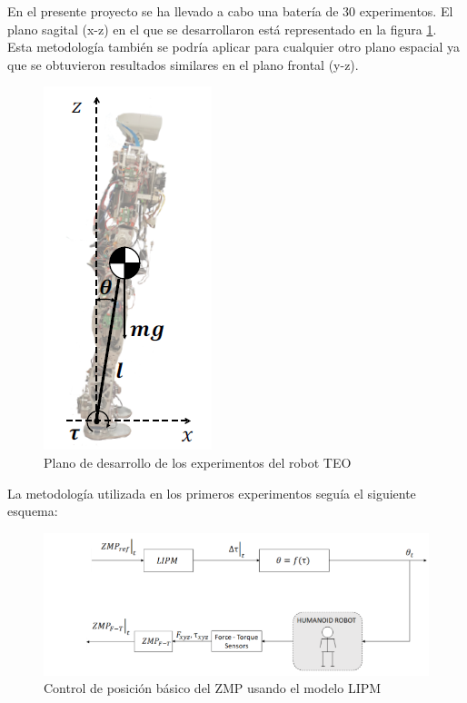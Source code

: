 En el presente proyecto se ha llevado a cabo una batería de 30 experimentos. El plano sagital (x-z) en el que se desarrollaron está representado en la figura \ref{figura53}. Esta metodología también se podría aplicar para cualquier otro plano espacial ya que se obtuvieron resultados similares en el plano frontal (y-z).

\begin{figure}[H]
\centering
\includegraphics[scale=0.65]{imagenes/apartado_5/53_postura_inicial_experimental_teo}
\caption{Plano de desarrollo de los experimentos del robot TEO}
\label{figura53}
\end{figure}

La metodología utilizada en los primeros experimentos seguía el siguiente esquema:

\begin{figure}[H]
\centering
\includegraphics[scale=2.2]{imagenes/apartado_5/54_esquema_bucle_abierto}
\caption{Control de posición básico del ZMP usando el modelo LIPM}
\label{figura54}
\end{figure}


